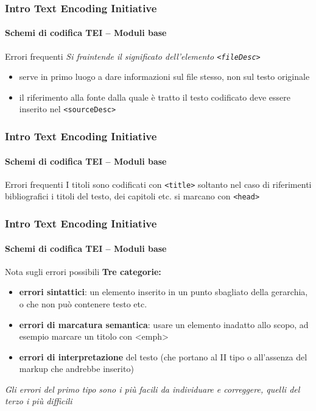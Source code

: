 \begin{frame}
	\frametitle{Intro Text Encoding Initiative}
	\framesubtitle{Schemi di codifica TEI – Moduli base}
	\addtocounter{nframe}{1}

	\begin{block}{Errori frequenti}
        \textit{Si fraintende il significato dell’elemento \texttt{<fileDesc>}}
        \begin{itemize}
            \item serve in primo luogo a dare informazioni sul file stesso, non sul testo originale
            \item il riferimento alla fonte dalla quale è tratto il testo codificato
            deve essere inserito nel \texttt{<sourceDesc>}
        \end{itemize}
    \end{block}

\end{frame}


\begin{frame}
	\frametitle{Intro Text Encoding Initiative}
	\framesubtitle{Schemi di codifica TEI – Moduli base}
	\addtocounter{nframe}{1}

	\begin{block}{Errori frequenti}
        I titoli sono codificati con \texttt{<title>} soltanto nel caso di riferimenti bibliografici i titoli del testo, dei capitoli etc. si marcano con \texttt{<head>}
    \end{block}
    
   

\end{frame}


\begin{frame}
	\frametitle{Intro Text Encoding Initiative}
	\framesubtitle{Schemi di codifica TEI – Moduli base}
	\addtocounter{nframe}{1}

	\begin{block}{Nota sugli errori possibili}
        \textbf{Tre categorie:}
        \begin{itemize}
            \item \textbf{errori sintattici}: un elemento inserito in un punto sbagliato
            della gerarchia, o che non può contenere testo etc.
            \item \textbf{errori di marcatura semantica}: usare un elemento inadatto
            allo scopo, ad esempio marcare un titolo con <emph>
            \item \textbf{errori di interpretazione} del testo (che portano al II tipo o
            all’assenza del markup che andrebbe inserito)
        \end{itemize}
       
    \end{block}
    \textit{Gli errori del primo tipo sono i più facili da individuare e
        correggere, quelli del terzo i più difficili}

\end{frame}


